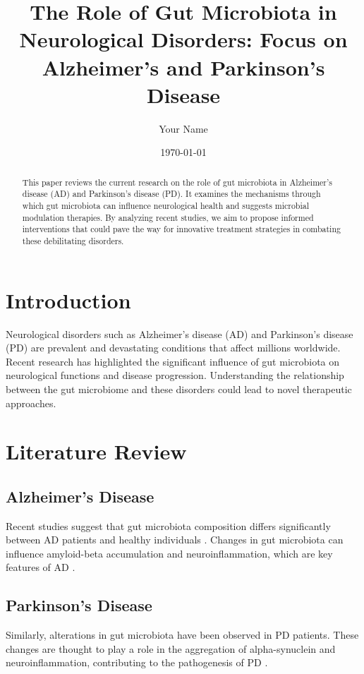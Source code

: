 \documentclass[12pt]{article}
\title{The Role of Gut Microbiota in Neurological Disorders: Focus on Alzheimer's and Parkinson's Disease}
\author{Your Name}
\date{\today}
\begin{document}
\maketitle

\begin{abstract}
This paper reviews the current research on the role of gut microbiota in Alzheimer's disease (AD) and Parkinson's disease (PD). It examines the mechanisms through which gut microbiota can influence neurological health and suggests microbial modulation therapies. By analyzing recent studies, we aim to propose informed interventions that could pave the way for innovative treatment strategies in combating these debilitating disorders.
\end{abstract}

\section{Introduction}
Neurological disorders such as Alzheimer's disease (AD) and Parkinson's disease (PD) are prevalent and devastating conditions that affect millions worldwide. Recent research has highlighted the significant influence of gut microbiota on neurological functions and disease progression. Understanding the relationship between the gut microbiome and these disorders could lead to novel therapeutic approaches.

\section{Literature Review}
\subsection{Alzheimer's Disease}
Recent studies suggest that gut microbiota composition differs significantly between AD patients and healthy individuals \cite{vogt2017}. Changes in gut microbiota can influence amyloid-beta accumulation and neuroinflammation, which are key features of AD \cite{kowalski2015}.

\subsection{Parkinson's Disease}
Similarly, alterations in gut microbiota have been observed in PD patients. These changes are thought to play a role in the aggregation of alpha-synuclein and neuroinflammation, contributing to the pathogenesis of PD \cite{scheperjans2015}.
\end{document}
